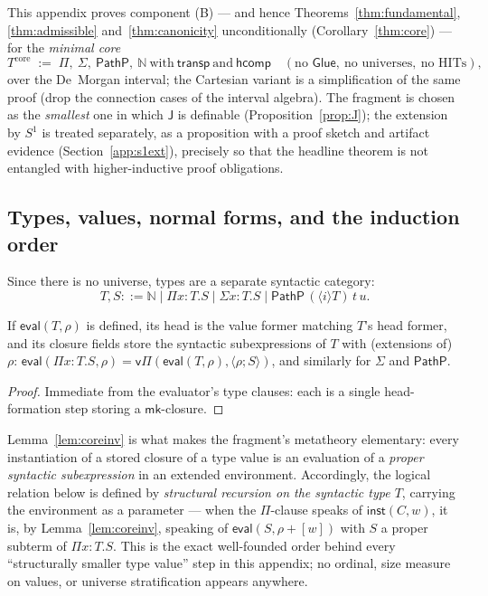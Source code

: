 \documentclass{lmcs}
\newcommand{\transp}{\mathsf{transp}}
\newcommand{\hcomp}{\mathsf{hcomp}}
\newcommand{\J}{\mathsf{J}}
\newcommand{\Glue}{\mathsf{Glue}}
\newcommand{\evalop}{\mathsf{eval}}
\newcommand{\capp}{\mathsf{inst}}
\begin{document}
This appendix proves component (B) --- and hence
Theorems~\ref{thm:fundamental}, \ref{thm:admissible}
and~\ref{thm:canonicity} unconditionally
(Corollary~\ref{thm:core}) --- for the \emph{minimal core}
\[
  T^{\mathrm{core}} \;:=\;
  \Pi,\ \Sigma,\ \mathsf{PathP},\ \mathbb{N}
  \ \text{with}\ \transp\ \text{and}\ \hcomp
  \quad(\text{no } \Glue,\ \text{no universes},\ \text{no HITs}),
\]
over the De~Morgan interval; the Cartesian variant is a
simplification of the same proof (drop the connection cases of the
interval algebra).  The fragment is chosen as the \emph{smallest}
one in which $\J$ is definable (Proposition~\ref{prop:J}); the
extension by $S^1$ is treated separately, as a proposition with a
proof sketch and artifact evidence
(Section~\ref{app:s1ext}), precisely so that the headline theorem
is not entangled with higher-inductive proof obligations.

\subsection{Types, values, normal forms, and the induction order}
\label{app:coretypes}

Since there is no universe, types are a separate syntactic
category:
\[
  T, S ::= \mathbb{N} \mid \Pi x{:}T.S \mid \Sigma x{:}T.S \mid
  \mathsf{PathP}\,(\langle i \rangle T)\,t\,u .
\]

\begin{lem}\label{lem:coreinv}
  If $\evalop(T, \rho)$ is defined, its head is the value former
  matching $T$'s head former, and its closure fields store the
  syntactic subexpressions of $T$ with (extensions of) $\rho$:
  $\evalop(\Pi x{:}T.S, \rho) = \mathsf{v}\Pi(\evalop(T,\rho),
  \langle \rho; S \rangle)$, and similarly for $\Sigma$ and
  $\mathsf{PathP}$.
\end{lem}
\begin{proof}
  Immediate from the evaluator's type clauses: each is a single
  head-formation step storing a $\mathsf{mk}$-closure.
\end{proof}

\begin{rem}\label{rem:order}
  Lemma~\ref{lem:coreinv} is what makes the fragment's metatheory
  elementary: every instantiation of a stored closure of a type
  value is an evaluation of a \emph{proper syntactic subexpression}
  in an extended environment.  Accordingly, the logical relation
  below is defined by \emph{structural recursion on the syntactic
  type $T$}, carrying the environment as a parameter --- when the
  $\Pi$-clause speaks of $\capp(C, w)$, it is, by
  Lemma~\ref{lem:coreinv}, speaking of $\evalop(S, \rho{+}[w])$
  with $S$ a proper subterm of $\Pi x{:}T.S$.  This is the exact
  well-founded order behind every ``structurally smaller type
  value'' step in this appendix; no ordinal, size measure on
  values, or universe stratification appears anywhere.
\end{rem}
\end{document}
